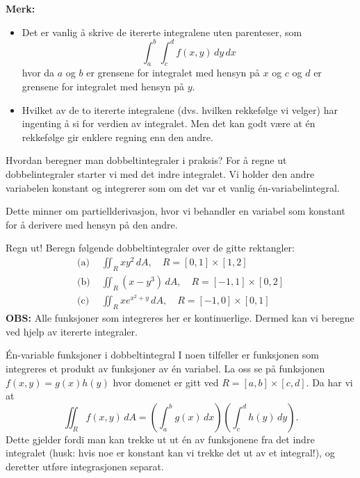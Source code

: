 \textbf{Merk:} 
\begin{itemize}
\item Det er vanlig å skrive de itererte integralene uten parenteser, som
$$\int_a^b \int_c^d f(x, y) \, dy  \, dx$$
hvor da $a$ og $b$ er grensene for integralet med
hensyn på $x$ og $c$ og $d$ er grensene for integralet
med hensyn på $y$.
\item 
Hvilket av de to itererte integralene (dvs. hvilken
rekkefølge vi velger) har ingenting å si for
verdien av integralet. Men det kan godt være at 
én rekkefølge gir enklere regning enn den andre. 
\end{itemize}

\begin{oppsum}{Hvordan beregner man dobbeltintegraler i praksis?}
For å regne ut dobbelintegraler starter vi med det indre integralet. Vi holder den andre variabelen konstant og integrerer som om det var et vanlig én-variabelintegral.

Dette minner om partiellderivasjon, hvor vi behandler en variabel som konstant for å derivere med hensyn på den andre.
\end{oppsum}

\begin{eks}{Regn ut!}
Beregn følgende dobbeltintegraler over de gitte rektangler:
\begin{align*}
\text{(a) }&\iint_R xy^2 \, dA, \quad R = [0, 1] \times [1, 2]\\
\text{(b) }&\iint_R (x - y^3) \, dA, \quad R = [-1, 1] \times [0, 2]\\
\text{(c) }&\iint_R x e^{x^2 +y} \, dA, \quad R = [-1, 0] \times [0, 1]
\end{align*}
\textbf{OBS:} Alle funksjoner som integreres her er kontinuerlige. Dermed kan vi beregne ved hjelp av itererte integraler.
\end{eks}

\begin{oppsum}{Én-variable funksjoner i dobbeltintegral}
I noen tilfeller er funksjonen som integreres et produkt av funksjoner av én variabel. La oss se på funksjonen \( f(x, y) = g(x) h(y) \) hvor domenet er gitt ved \( R = [a, b] \times [c, d] \). Da har vi at
\[
\iint_R f(x, y) \, dA = \left( \int_a^b g(x) \, dx \right) \left( \int_c^d h(y) \, dy \right).
\]
Dette gjelder fordi man kan trekke ut ut én av funksjonene fra det indre integralet (husk: hvis noe er konstant kan vi trekke det ut av et integral!), og deretter utføre integrasjonen separat.
\end{oppsum}


